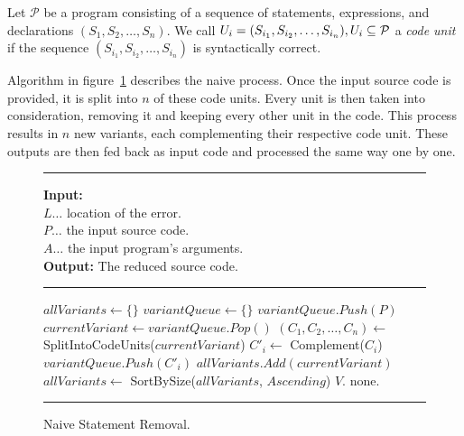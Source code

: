 \begin{defn}\label{def04:3}
  Let $\mathcal{P}$ be a program consisting of a sequence of statements, 
  expressions, and declarations $(S_1, S_2, \ldots, S_n)$. 
  We call $U_i = (S_{i_1},\-S_{i_2},\-\ldots,\-S_{i_n}), 
  U_i \subseteq \mathcal{P}$ a \emph{code unit} if the sequence 
  $(S_{i_1}, S_{i_2}, \ldots, S_{i_n})$ is syntactically
  correct.
\end{defn}

Algorithm in figure~\ref{alg:naive} describes the naive process. 
Once the input source code is provided, it is split into $n$ of these 
code units.
Every unit is then taken into consideration, removing it and keeping every 
other unit in the code.
This process results in $n$ new variants, each complementing their 
respective code unit.
These outputs are then fed back as input code and processed the same way 
one by one.

\begin{figure}[h]
	\hrule height.8pt depth0pt \kern2pt
	\textbf{Input:} \\
	\hspace*{\algorithmicindent} $L \ldots$ location of the error. \\
	\hspace*{\algorithmicindent} $P \ldots$ the input source code. \\
	\hspace*{\algorithmicindent} $A \ldots$ the input program's arguments. \\
	\textbf{Output:} The reduced source code. 
	\hrule height.8pt depth0pt \kern2pt
	\begin{algorithmic}[1]
		\State $allVariants \leftarrow \{\}$
		\State $variantQueue \leftarrow \{\}$
		\State $variantQueue.Push(P)$
			\State $currentVariant \leftarrow variantQueue.Pop()$
			\State $(C_1, C_2, \ldots, C_n) \leftarrow$ SplitIntoCodeUnits($currentVariant$)
				\State ${C'}_i \leftarrow$ Complement($C_i$)
				\State $variantQueue.Push({C'}_i)$
			\EndFor
			\State $allVariants.Add(currentVariant)$
		\EndWhile
		\State $allVariants \leftarrow$ SortBySize($allVariants$, $Ascending$)
				\Return $V$.
			\EndIf
		\EndFor
		\State \Return none.
	\end{algorithmic} 
	\hrule height.8pt depth0pt \kern2pt
	\caption{Naive Statement Removal.} 
	\label{alg:naive}
\end{figure}


